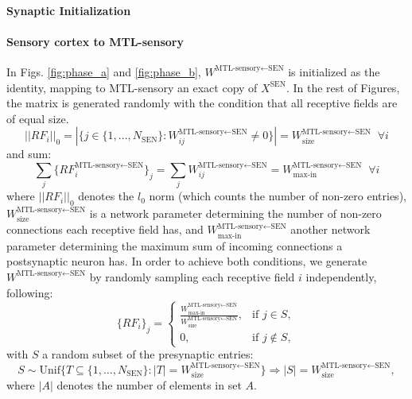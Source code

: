 \documentclass{article}
\begin{document}
\paragraph{Synaptic Initialization}
\paragraph{Sensory cortex to MTL-sensory}
In Figs. \ref{fig:phase_a} and \ref{fig:phase_b}, $W^{\textrm{MTL-sensory}\leftarrow\textrm{SEN}}$ is initialized as the identity, mapping to MTL-sensory an exact copy of $X^\textrm{SEN}$. In the rest of Figures, the matrix is generated randomly with the condition that all receptive fields are of equal size.
\begin{equation}
    || RF_i ||_0 = |\{j \in \{1, ..., N_\textrm{SEN}\} : W^{\textrm{MTL-sensory}\leftarrow\textrm{SEN}}_{ij} \neq 0\}| = W^{\textrm{MTL-sensory}\leftarrow\textrm{SEN}}_\textrm{size}\;\; \forall i
\end{equation}
and sum:
\begin{equation}
    \sum_j\{RF_i^{\textrm{MTL-sensory}\leftarrow\textrm{SEN}}\}_j = \sum_jW^{\textrm{MTL-sensory}\leftarrow\textrm{SEN}}_{ij} = W^{\textrm{MTL-sensory}\leftarrow\textrm{SEN}}_\textrm{max-in}\;\; \forall i
\end{equation}
where $|| RF_i ||_0$ denotes the $l_0$ norm (which counts the number of non-zero entries), $W^{\textrm{MTL-sensory}\leftarrow\textrm{SEN}}_\textrm{size}$ is a network parameter determining the number of non-zero connections each receptive field has, and $W^{\textrm{MTL-sensory}\leftarrow\textrm{SEN}}_\textrm{max-in}$ another network parameter determining the maximum sum of incoming connections a postsynaptic neuron has. In order to achieve both conditions, we generate $W^{\textrm{MTL-sensory}\leftarrow\textrm{SEN}}$ by randomly sampling each receptive field $i$ independently, following:
\begin{equation}
    \{RF_i\}_j =
\begin{cases}
\frac{W^{\textrm{MTL-sensory}\leftarrow\textrm{SEN}}_\textrm{max-in}}{W^{\textrm{MTL-sensory}\leftarrow\textrm{SEN}}_\textrm{size}}, & \text{if } j \in S, \\
0, & \text{if } j \notin S,
\end{cases}
\end{equation}
with $S$ a random subset of the presynaptic entries:
\begin{equation} 
S \sim \text{Unif}\big\{ T \subseteq \{1,\dots,N_\textrm{SEN}\} : |T| = W^{\textrm{MTL-sensory}\leftarrow\textrm{SEN}}_\textrm{size} \big\} \Longrightarrow  |S| = W^{\textrm{MTL-sensory}\leftarrow\textrm{SEN}}_\textrm{size}, 
\end{equation}
where $|A|$ denotes the number of elements in set $A$.
\end{document}
